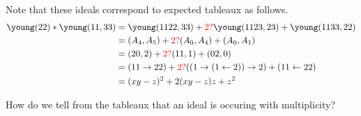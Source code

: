 \documentclass{article}
\begin{document}
\begin{example}
Note that these ideals correspond to expected tableaux as follows.
\begin{align}
\young(22) \ast \young(11,33) &= \young(1122,33) + {\color{red}2?}\young(1123,23) + \young(1133,22)  \\
  &= (A_4, A_5) + {\color{red}2?}(A_0,A_4) + (A_0, A_1) \\
  &= (20,2) + {\color{red}2?}(11,1) + (02,0) \\
  &= (11\to 22) + {\color{red}2?}((1\to (1\leftarrow 2))\to 2) + (11\leftarrow 22) \\ 
  &= (xy-z)^2 + 2(xy-z)z + z^2
\end{align} 
\begin{question}
    How do we tell from the tableaux that an ideal is occuring with multiplicity? 
\end{question}
\end{example}
\end{document}
